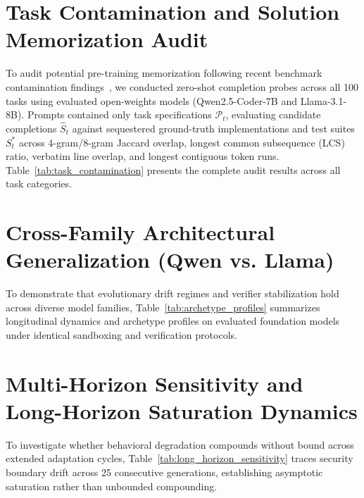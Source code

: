 \documentclass[conference]{IEEEtran}
\begin{document}


\section{Task Contamination and Solution Memorization Audit}
\label{app:task_contamination}

To audit potential pre-training memorization following recent benchmark contamination findings~\cite{openai2026swebenchleakage}, we conducted zero-shot completion probes across all 100 tasks using evaluated open-weights models (Qwen2.5-Coder-7B and Llama-3.1-8B). Prompts contained only task specifications $\mathcal{P}_t$, evaluating candidate completions $\hat{S}_t$ against sequestered ground-truth implementations and test suites $S^*_t$ across 4-gram/8-gram Jaccard overlap, longest common subsequence (LCS) ratio, verbatim line overlap, and longest contiguous token runs. Table~\ref{tab:task_contamination} presents the complete audit results across all task categories.



\section{Cross-Family Architectural Generalization (Qwen vs. Llama)}
\label{app:cross_family}

To demonstrate that evolutionary drift regimes and verifier stabilization hold across diverse model families, Table~\ref{tab:archetype_profiles} summarizes longitudinal dynamics and archetype profiles on evaluated foundation models under identical sandboxing and verification protocols.



\section{Multi-Horizon Sensitivity and Long-Horizon Saturation Dynamics}
\label{app:horizon_sensitivity}

To investigate whether behavioral degradation compounds without bound across extended adaptation cycles, Table~\ref{tab:long_horizon_sensitivity} traces security boundary drift across 25 consecutive generations, establishing asymptotic saturation rather than unbounded compounding.





\end{document}
